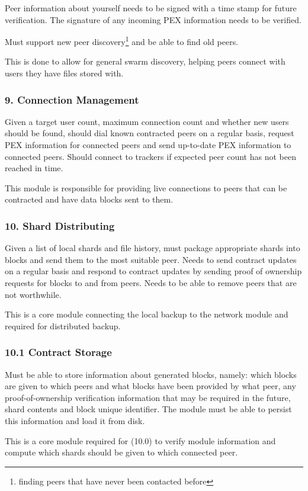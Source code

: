 \documentclass[11pt, a4paper, twoside]{report}
\begin{document}
Peer information about yourself needs to be signed with a time stamp for future verification. The signature of any incoming PEX information needs to be verified.

Must support new peer discovery\footnote{finding peers that have never been contacted before} and be able to find old peers.

This is done to allow for general swarm discovery, helping peers connect with users they have files stored with.

\subsubsection{9. Connection Management}
Given a target user count, maximum connection count and whether new users should be found, should dial known contracted peers on a regular basis, request PEX information for connected peers and send up-to-date PEX information to connected peers. Should connect to trackers if expected peer count has not been reached in time.

This module is responsible for providing live connections to peers that can be contracted and have data blocks sent to them.

\subsubsection{10. Shard Distributing}
Given a list of local shards and file history, must package appropriate shards into blocks and send them to the most suitable peer. Needs to send contract updates on a regular basis and respond to contract updates by sending proof of ownership requests for blocks to and from peers. Needs to be able to remove peers that are not worthwhile.

This is a core module connecting the local backup to the network module and required for distributed backup.

\subsubsection{10.1 Contract Storage}
Must be able to store information about generated blocks, namely: which blocks are given to which peers and what blocks have been provided by what peer, any proof-of-ownership verification information that may be required in the future, shard contents and block unique identifier. The module must be able to persist this information and load it from disk.

This is a core module required for (10.0) to verify module information and compute which shards should be given to which connected peer.
\end{document}
